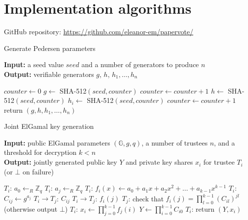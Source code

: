 \documentclass[12pt,a4paper]{article}
\theoremstyle{definition}
\begin{document}
\section{Implementation algorithms}
GitHub repository: \url{https://github.com/eleanor-em/papervote/}
\begin{algorithm} 	\caption{Generate Pedersen parameters}
\textbf{Input:} a seed value $\mathit{seed}$ and a number of generators to produce $n$\\
\textbf{Output:} verifiable generators $g$, $h$, $h_1, \ldots, h_n$
\begin{algorithmic}[1]
    \State  $\mathit{counter} \gets 0$
    \State  $g \gets$ SHA-512$(\mathit{seed}, \mathit{counter})$
    \State  $\textit{counter} \gets \mathit{counter} + 1$
    \State  $h \gets$ SHA-512$(\mathit{seed}, \mathit{counter})$
        \State $h_i \gets$ SHA-512$(\mathit{seed}, \mathit{counter})$
        \State  $\textit{counter} \gets \mathit{counter} + 1$
    \EndFor
    \State return $(g, h, h_1, \ldots, h_n)$
\end{algorithmic}
\end{algorithm}
\begin{algorithm}\caption{Joint ElGamal key generation}
\textbf{Input:} public ElGamal parameters $(\mathbb{G}, g, q)$, a number of trustees $n$, and a threshold for decryption $k < n$\\
\textbf{Output:} jointly generated public key $Y$ and private key shares $x_i$ for trustee $T_i$ (or $\bot$ on failure)
\begin{algorithmic}[1]
    \State  $T_i$: $a_0 \gets_R \mathbb{Z}_q$
        \State $T_i$: $a_j \gets_R \mathbb{Z}_q$
    \EndFor
    \State $T_i$: $f_i(x)\gets a_0 + a_1 x + a_2 x^2 + \ldots + a_{k-1} x^{k-1}$
        \State $T_i$: $C_{ij} \gets g^{a_j}$
        \State $T_i\rightarrow T_j$: $C_{ij}$
    \EndFor
        \State $T_i\rightarrow T_j$: $f_i(j)$
        \State $T_j$: check that $f_i(j)=\prod_{l=0}^{k-1}\left(C_{il}\right)^{jl}$ (otherwise output $\bot$)
    \EndFor
    \State $T_i$: $x_i \gets \prod_{j=0}^{k-1} f_j(i)$
    \State $Y \gets \prod_{i=0}^{k-1} C_{i0}$
    \State $T_i$: return $(Y, x_i)$
\end{algorithmic}
\end{algorithm}
\end{document}
